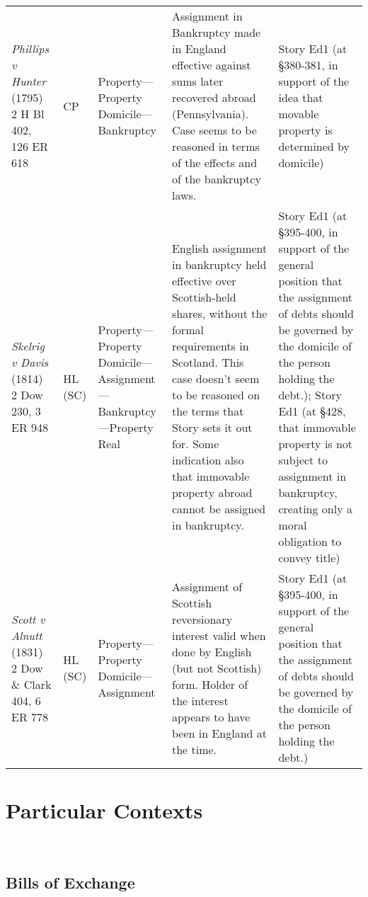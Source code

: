 \documentclass[twoside]{article}
\begin{document}
\begin{longtable}{p{4cm} p{1.7cm} p{2.5cm} p{5cm} p{2.5cm}}
\textit{Phillips v Hunter} (1795) 2 H Bl 402, 126 ER 618 & \small{CP} & \small{Property---Property Domicile---Bankruptcy} & \small{Assignment in Bankruptcy made in England effective against sums later recovered abroad (Pennsylvania). Case seems to be reasoned in terms of the effects and of the bankruptcy laws.} & \small{Story Ed1 (at §380-381, in support of the idea that movable property is determined by domicile)}\\ 
\textit{Skelrig v Davis} (1814) 2 Dow 230, 3 ER 948 & \small{HL (SC)} & \small{Property---Property Domicile---Assignment---Bankruptcy---Property Real} & \small{English assignment in bankruptcy held effective over Scottish-held shares, without the formal requirements in Scotland. This case doesn’t seem to be reasoned on the terms that Story sets it out for. Some indication also that immovable property abroad cannot be assigned in bankruptcy.} & \small{Story Ed1 (at §395-400, in support of the general position that the assignment of debts should be governed by the domicile of the person holding the debt.); Story Ed1 (at §428, that immovable property is not subject to assignment in bankruptcy, creating only a moral obligation to convey title)}\\ 
\textit{Scott v Alnutt} (1831) 2 Dow \& Clark 404, 6 ER 778 & \small{HL (SC)} & \small{Property---Property Domicile---Assignment} & \small{Assignment of Scottish reversionary interest valid when done by English (but not Scottish) form. Holder of the interest appears to have been in England at the time.} & \small{Story Ed1 (at §395-400, in support of the general position that the assignment of debts should be governed by the domicile of the person holding the debt.)}\\ 
\end{longtable}
\section{Particular Contexts}\
\subsection{Bills of Exchange}
\end{document}
